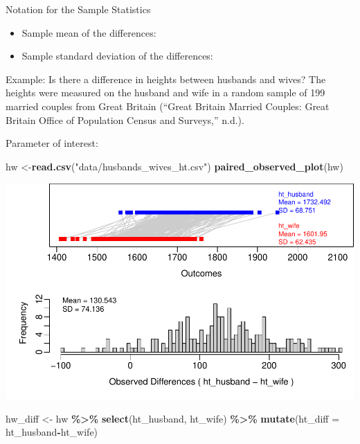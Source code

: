 \documentclass[
]{report}
\newenvironment{Shaded}{\begin{snugshade}}{\end{snugshade}}
\newcommand{\AttributeTok}[1]{\textcolor[rgb]{0.13,0.29,0.53}{#1}}
\newcommand{\FunctionTok}[1]{\textcolor[rgb]{0.13,0.29,0.53}{\textbf{#1}}}
\newcommand{\NormalTok}[1]{#1}
\newcommand{\OtherTok}[1]{\textcolor[rgb]{0.56,0.35,0.01}{#1}}
\newcommand{\SpecialCharTok}[1]{\textcolor[rgb]{0.81,0.36,0.00}{\textbf{#1}}}
\newcommand{\StringTok}[1]{\textcolor[rgb]{0.31,0.60,0.02}{#1}}
\begin{document}
\vspace{0.5in}

Notation for the Sample Statistics

\begin{itemize}
\item
  Sample mean of the differences:
\item
  Sample standard deviation of the differences:
\end{itemize}

Example: Is there a difference in heights between husbands and wives? The heights were measured on the husband and wife in a random sample of 199 married couples from Great Britain ({``Great Britain Married Couples: Great Britain Office of Population Census and Surveys,''} n.d.).

Parameter of interest:

\vspace{0.8in}

\begin{Shaded}
\begin{Highlighting}[]
\NormalTok{hw }\OtherTok{\textless{}{-}}\FunctionTok{read.csv}\NormalTok{(}\StringTok{"data/husbands\_wives\_ht.csv"}\NormalTok{)}
\FunctionTok{paired\_observed\_plot}\NormalTok{(hw)}
\end{Highlighting}
\end{Shaded}

\begin{center}\includegraphics[width=0.7\linewidth]{11-LN011-paired_files/figure-latex/unnamed-chunk-1-1} \end{center}

\begin{Shaded}
\begin{Highlighting}[]
\NormalTok{hw\_diff }\OtherTok{\textless{}{-}}\NormalTok{ hw }\SpecialCharTok{\%\textgreater{}\%}
  \FunctionTok{select}\NormalTok{(ht\_husband, ht\_wife) }\SpecialCharTok{\%\textgreater{}\%}
  \FunctionTok{mutate}\NormalTok{(}\AttributeTok{ht\_diff =}\NormalTok{ ht\_husband}\SpecialCharTok{{-}}\NormalTok{ht\_wife)}
\end{Highlighting}
\end{Shaded}
\end{document}
